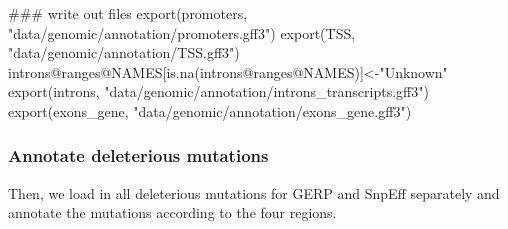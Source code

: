 \documentclass[
  letterpaper,
  DIV=11,
  numbers=noendperiod]{scrreprt}
\newenvironment{Shaded}{}{}
\newcommand{\DocumentationTok}[1]{\textcolor[rgb]{0.42,0.45,0.49}{#1}}
\newcommand{\FunctionTok}[1]{\textcolor[rgb]{0.44,0.26,0.76}{#1}}
\newcommand{\NormalTok}[1]{\textcolor[rgb]{0.14,0.16,0.18}{#1}}
\newcommand{\OtherTok}[1]{\textcolor[rgb]{0.44,0.26,0.76}{#1}}
\newcommand{\SpecialCharTok}[1]{\textcolor[rgb]{0.00,0.36,0.77}{#1}}
\newcommand{\StringTok}[1]{\textcolor[rgb]{0.01,0.18,0.38}{#1}}
\begin{document}
\begin{Shaded}
\begin{Highlighting}[]
\DocumentationTok{\#\#\# write out files}
\FunctionTok{export}\NormalTok{(promoters, }\StringTok{"data/genomic/annotation/promoters.gff3"}\NormalTok{)}
\FunctionTok{export}\NormalTok{(TSS, }\StringTok{"data/genomic/annotation/TSS.gff3"}\NormalTok{)}
\NormalTok{introns}\SpecialCharTok{@}\NormalTok{ranges}\SpecialCharTok{@}\NormalTok{NAMES[}\FunctionTok{is.na}\NormalTok{(introns}\SpecialCharTok{@}\NormalTok{ranges}\SpecialCharTok{@}\NormalTok{NAMES)]}\OtherTok{\textless{}{-}}\StringTok{"Unknown"}
\FunctionTok{export}\NormalTok{(introns, }\StringTok{"data/genomic/annotation/introns\_transcripts.gff3"}\NormalTok{)}
\FunctionTok{export}\NormalTok{(exons\_gene, }\StringTok{"data/genomic/annotation/exons\_gene.gff3"}\NormalTok{)}
\end{Highlighting}
\end{Shaded}

\subsubsection{Annotate deleterious
mutations}\label{annotate-deleterious-mutations}

Then, we load in all deleterious mutations for GERP and SnpEff
separately and annotate the mutations according to the four regions.
\end{document}
